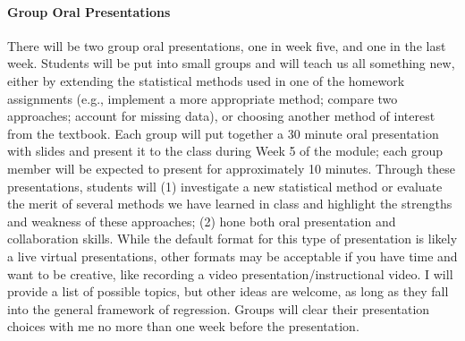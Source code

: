 \documentclass[11pt]{article}
\begin{document}
\paragraph{Group Oral Presentations}
There will be two group oral presentations, one in week five, and one in the last week. Students will be put into small groups and will teach us all something new, either by extending the statistical methods used in one of the homework assignments (e.g., implement a more appropriate method; compare two approaches; account for missing data), or choosing another method of interest from the textbook. Each group will put together a 30 minute oral presentation with slides and present it to the class during Week 5 of the module; each group member will be expected to present for approximately 10 minutes. Through these presentations, students will (1) investigate a new statistical method or evaluate the merit of several methods we have learned in class and highlight the strengths and weakness of these approaches; (2) hone both oral presentation and collaboration skills. While the default format for this type of presentation is likely a live virtual presentations, other formats may be acceptable if you have time and want to be creative, like recording a video presentation/instructional video. I will provide a list of possible topics, but other ideas are welcome, as long as they fall into the general framework of regression. Groups will clear their presentation choices with me no more than one week before the presentation. 

\end{document}
